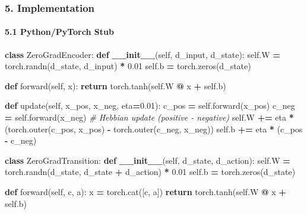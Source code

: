 \documentclass[
  11pt,
  a4paper,
]{article}
\newenvironment{Shaded}{\begin{snugshade}}{\end{snugshade}}
\newcommand{\CommentTok}[1]{\textcolor[rgb]{0.56,0.35,0.01}{\textit{#1}}}
\newcommand{\ControlFlowTok}[1]{\textcolor[rgb]{0.13,0.29,0.53}{\textbf{#1}}}
\newcommand{\FloatTok}[1]{\textcolor[rgb]{0.00,0.00,0.81}{#1}}
\newcommand{\FunctionTok}[1]{\textcolor[rgb]{0.13,0.29,0.53}{\textbf{#1}}}
\newcommand{\KeywordTok}[1]{\textcolor[rgb]{0.13,0.29,0.53}{\textbf{#1}}}
\newcommand{\NormalTok}[1]{#1}
\newcommand{\OperatorTok}[1]{\textcolor[rgb]{0.81,0.36,0.00}{\textbf{#1}}}
\newcommand{\VariableTok}[1]{\textcolor[rgb]{0.00,0.00,0.00}{#1}}
\begin{document}
\subsubsection{5. Implementation}\label{implementation-8}

\paragraph{5.1 Python/PyTorch Stub}\label{pythonpytorch-stub}

\begin{Shaded}
\begin{Highlighting}[]
\KeywordTok{class}\NormalTok{ ZeroGradEncoder:}
    \KeywordTok{def} \FunctionTok{\_\_init\_\_}\NormalTok{(}\VariableTok{self}\NormalTok{, d\_input, d\_state):}
        \VariableTok{self}\NormalTok{.W }\OperatorTok{=}\NormalTok{ torch.randn(d\_state, d\_input) }\OperatorTok{*} \FloatTok{0.01}
        \VariableTok{self}\NormalTok{.b }\OperatorTok{=}\NormalTok{ torch.zeros(d\_state)}
    
    \KeywordTok{def}\NormalTok{ forward(}\VariableTok{self}\NormalTok{, x):}
        \ControlFlowTok{return}\NormalTok{ torch.tanh(}\VariableTok{self}\NormalTok{.W }\OperatorTok{@}\NormalTok{ x }\OperatorTok{+} \VariableTok{self}\NormalTok{.b)}
    
    \KeywordTok{def}\NormalTok{ update(}\VariableTok{self}\NormalTok{, x\_pos, x\_neg, eta}\OperatorTok{=}\FloatTok{0.01}\NormalTok{):}
\NormalTok{        c\_pos }\OperatorTok{=} \VariableTok{self}\NormalTok{.forward(x\_pos)}
\NormalTok{        c\_neg }\OperatorTok{=} \VariableTok{self}\NormalTok{.forward(x\_neg)}
        \CommentTok{\# Hebbian update (positive {-} negative)}
        \VariableTok{self}\NormalTok{.W }\OperatorTok{+=}\NormalTok{ eta }\OperatorTok{*}\NormalTok{ (torch.outer(c\_pos, x\_pos) }\OperatorTok{{-}}\NormalTok{ torch.outer(c\_neg, x\_neg))}
        \VariableTok{self}\NormalTok{.b }\OperatorTok{+=}\NormalTok{ eta }\OperatorTok{*}\NormalTok{ (c\_pos }\OperatorTok{{-}}\NormalTok{ c\_neg)}

\KeywordTok{class}\NormalTok{ ZeroGradTransition:}
    \KeywordTok{def} \FunctionTok{\_\_init\_\_}\NormalTok{(}\VariableTok{self}\NormalTok{, d\_state, d\_action):}
        \VariableTok{self}\NormalTok{.W }\OperatorTok{=}\NormalTok{ torch.randn(d\_state, d\_state }\OperatorTok{+}\NormalTok{ d\_action) }\OperatorTok{*} \FloatTok{0.01}
        \VariableTok{self}\NormalTok{.b }\OperatorTok{=}\NormalTok{ torch.zeros(d\_state)}
    
    \KeywordTok{def}\NormalTok{ forward(}\VariableTok{self}\NormalTok{, c, a):}
\NormalTok{        x }\OperatorTok{=}\NormalTok{ torch.cat([c, a])}
        \ControlFlowTok{return}\NormalTok{ torch.tanh(}\VariableTok{self}\NormalTok{.W }\OperatorTok{@}\NormalTok{ x }\OperatorTok{+} \VariableTok{self}\NormalTok{.b)}
    

\end{Highlighting}
\end{Shaded}
\end{document}
